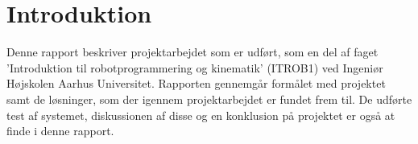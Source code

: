 \clearpage
\section{Introduktion}

Denne rapport beskriver projektarbejdet som er udført, som en del af faget 'Introduktion til robotprogrammering og kinematik' (ITROB1) ved Ingeniør Højskolen Aarhus Universitet. Rapporten gennemgår formålet med projektet samt de løsninger, som der igennem projektarbejdet er fundet frem til. De udførte test af systemet, diskussionen af disse og en konklusion på projektet er også at finde i denne rapport.



